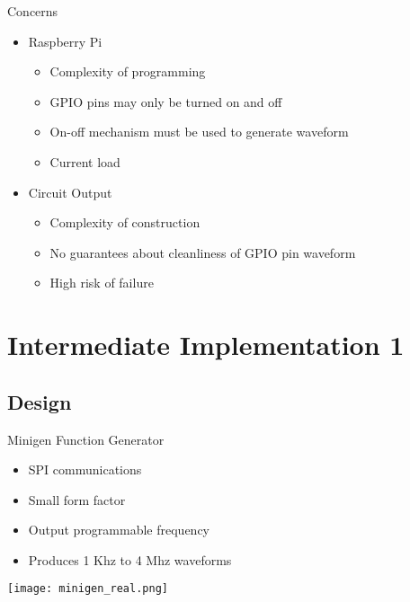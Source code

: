 \begin{frame}{Concerns}
  \begin{block}{}
  \begin{itemize}
    \item Raspberry Pi 
      \begin{itemize}
        \item Complexity of programming
        \item GPIO pins may only be turned on and off
        \item On-off mechanism must be used to generate waveform
        \item Current load
      \end{itemize}
    \item Circuit Output
      \begin{itemize}
        \item Complexity of construction
        \item No guarantees about cleanliness of GPIO pin waveform 
        \item High risk of failure
      \end{itemize}
    \end{itemize}
  \end{block}

\end{frame}

\section{Intermediate Implementation 1}

\subsection{Design}

\begin{frame}{Minigen Function Generator}
  
  \begin{itemize}
    \item SPI communications
    \item Small form factor
    \item Output programmable frequency 
    \item Produces 1 Khz to 4 Mhz waveforms
  \end{itemize}


  \begin{center}
  \texttt{[image: minigen\_real.png]}
  \end{center}


\end{frame}

